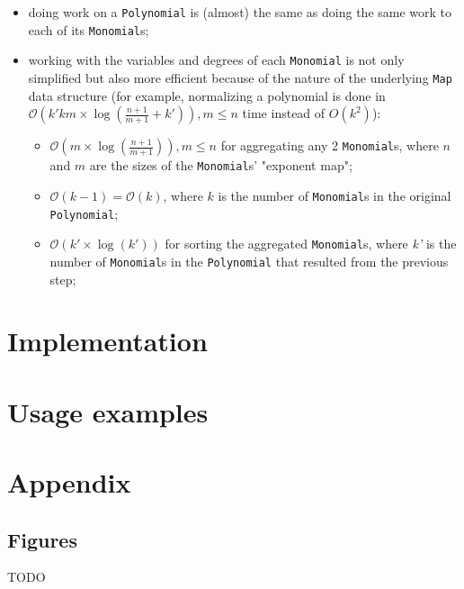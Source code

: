 \documentclass[11pt,a4paper]{article}
\begin{document}
\begin{itemize}
    \item doing work on a \lstinline{Polynomial} is (almost) the same as doing the same work to each of its \lstinline{Monomial}s;

    \item working with the variables and degrees of each \lstinline{Monomial} is not only simplified but also more efficient because of the nature of the underlying \lstinline{Map} data structure (for example, normalizing a polynomial is done in $ \mathcal{O} \left( k' k m \times \log \left( \frac{n+1}{m+1} + k' \right) \right), m \leq n $ time instead of $ O(k^2) $):
          \begin{itemize}
              \item $ \mathcal{O} \left( m \times \log \left( \frac{n+1}{m+1} \right) \right), m \leq n $ for aggregating any 2 \lstinline{Monomial}s, where $n$ and $m$ are the sizes of the \lstinline{Monomial}s' "exponent map";

              \item $ \mathcal{O} (k-1) = \mathcal{O} (k) $, where $k$ is the number of \lstinline{Monomial}s in the original \lstinline{Polynomial};

              \item $ \mathcal{O} (k' \times \log(k')) $ for sorting the aggregated \lstinline{Monomial}s, where \textit{k'} is the number of \lstinline{Monomial}s in the \lstinline{Polynomial} that resulted from the previous step;
          \end{itemize}

\end{itemize}

\section{Implementation}

\section{Usage examples}

\pagebreak

\appendix
\section{Appendix}

\subsection{Figures}

TODO
\end{document}
